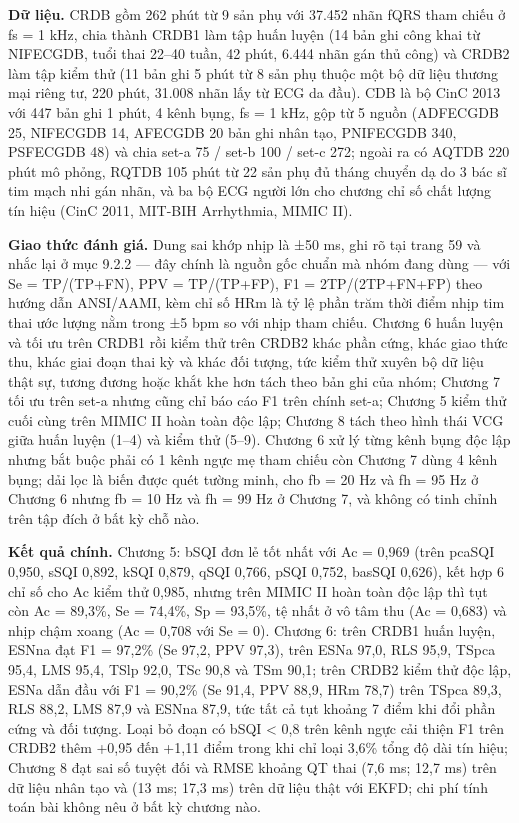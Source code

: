 \documentclass[12pt,a4paper]{article}
\begin{document}
\noindent \textbf{Dữ liệu.} CRDB gồm 262 phút từ 9 sản phụ với 37.452 nhãn fQRS tham chiếu ở fs = 1 kHz, chia thành CRDB1 làm tập huấn luyện (14 bản ghi công khai từ NIFECGDB, tuổi thai 22–40 tuần, 42 phút, 6.444 nhãn gán thủ công) và CRDB2 làm tập kiểm thử (11 bản ghi 5 phút từ 8 sản phụ thuộc một bộ dữ liệu thương mại riêng tư, 220 phút, 31.008 nhãn lấy từ ECG da đầu). CDB là bộ CinC 2013 với 447 bản ghi 1 phút, 4 kênh bụng, fs = 1 kHz, gộp từ 5 nguồn (ADFECGDB 25, NIFECGDB 14, AFECGDB 20 bản ghi nhân tạo, PNIFECGDB 340, PSFECGDB 48) và chia set-a 75 / set-b 100 / set-c 272; ngoài ra có AQTDB 220 phút mô phỏng, RQTDB 105 phút từ 22 sản phụ đủ tháng chuyển dạ do 3 bác sĩ tim mạch nhi gán nhãn, và ba bộ ECG người lớn cho chương chỉ số chất lượng tín hiệu (CinC 2011, MIT-BIH Arrhythmia, MIMIC II).\par\vspace{3pt}
\noindent \textbf{Giao thức đánh giá.} Dung sai khớp nhịp là ±50 ms, ghi rõ tại trang 59 và nhắc lại ở mục 9.2.2 — đây chính là nguồn gốc chuẩn mà nhóm đang dùng — với Se = TP/(TP+FN), PPV = TP/(TP+FP), F1 = 2TP/(2TP+FN+FP) theo hướng dẫn ANSI/AAMI, kèm chỉ số HRm là tỷ lệ phần trăm thời điểm nhịp tim thai ước lượng nằm trong ±5 bpm so với nhịp tham chiếu. Chương 6 huấn luyện và tối ưu trên CRDB1 rồi kiểm thử trên CRDB2 khác phần cứng, khác giao thức thu, khác giai đoạn thai kỳ và khác đối tượng, tức kiểm thử xuyên bộ dữ liệu thật sự, tương đương hoặc khắt khe hơn tách theo bản ghi của nhóm; Chương 7 tối ưu trên set-a nhưng cũng chỉ báo cáo F1 trên chính set-a; Chương 5 kiểm thử cuối cùng trên MIMIC II hoàn toàn độc lập; Chương 8 tách theo hình thái VCG giữa huấn luyện (1–4) và kiểm thử (5–9). Chương 6 xử lý từng kênh bụng độc lập nhưng bắt buộc phải có 1 kênh ngực mẹ tham chiếu còn Chương 7 dùng 4 kênh bụng; dải lọc là biến được quét tường minh, cho fb = 20 Hz và fh = 95 Hz ở Chương 6 nhưng fb = 10 Hz và fh = 99 Hz ở Chương 7, và không có tinh chỉnh trên tập đích ở bất kỳ chỗ nào.\par\vspace{3pt}
\noindent \textbf{Kết quả chính.} Chương 5: bSQI đơn lẻ tốt nhất với Ac = 0,969 (trên pcaSQI 0,950, sSQI 0,892, kSQI 0,879, qSQI 0,766, pSQI 0,752, basSQI 0,626), kết hợp 6 chỉ số cho Ac kiểm thử 0,985, nhưng trên MIMIC II hoàn toàn độc lập thì tụt còn Ac = 89,3\%, Se = 74,4\%, Sp = 93,5\%, tệ nhất ở vô tâm thu (Ac = 0,683) và nhịp chậm xoang (Ac = 0,708 với Se = 0). Chương 6: trên CRDB1 huấn luyện, ESNna đạt F1 = 97,2\% (Se 97,2, PPV 97,3), trên ESNa 97,0, RLS 95,9, TSpca 95,4, LMS 95,4, TSlp 92,0, TSc 90,8 và TSm 90,1; trên CRDB2 kiểm thử độc lập, ESNa dẫn đầu với F1 = 90,2\% (Se 91,4, PPV 88,9, HRm 78,7) trên TSpca 89,3, RLS 88,2, LMS 87,9 và ESNna 87,9, tức tất cả tụt khoảng 7 điểm khi đổi phần cứng và đối tượng. Loại bỏ đoạn có bSQI < 0,8 trên kênh ngực cải thiện F1 trên CRDB2 thêm +0,95 đến +1,11 điểm trong khi chỉ loại 3,6\% tổng độ dài tín hiệu; Chương 8 đạt sai số tuyệt đối và RMSE khoảng QT thai (7,6 ms; 12,7 ms) trên dữ liệu nhân tạo và (13 ms; 17,3 ms) trên dữ liệu thật với EKFD; chi phí tính toán bài không nêu ở bất kỳ chương nào.\par\vspace{3pt}
\end{document}
